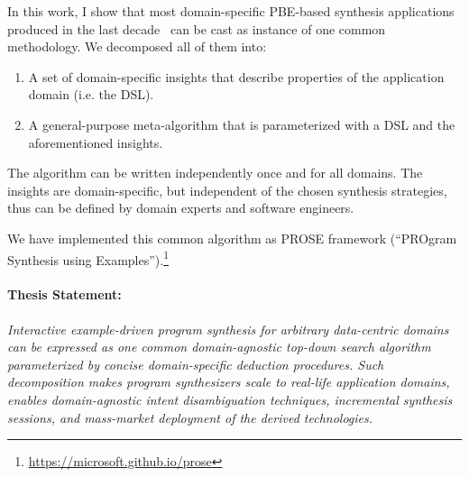 In this work, I show that most domain-specific PBE-based synthesis applications produced in the last
decade~\cite{smartedit,miller:colorful,flashfill,flashextract,flashrelate,flashnormalize,vldb12:semantic,andersen:procedural,pldi15:swarat,pldi15:osera,harris2011spreadsheet,singh2012synthesizing}
can be cast as instance of one common methodology.
We decomposed all of them into:
\begin{enumerate}[nosep]
    \item A set of domain-specific insights that describe properties of the application domain (i.e. the DSL).
    \item A general-purpose meta-algorithm that is parameterized with a DSL and the aforementioned insights.
\end{enumerate}
The algorithm can be written independently once and for all domains.
The insights are domain-specific, but independent of the chosen synthesis strategies, thus can be defined by
domain experts and software engineers.

We have implemented this common algorithm as PROSE framework (``PROgram Synthesis using
Examples'').\footnote{\url{https://microsoft.github.io/prose}}

\paragraph{Thesis Statement:}
\emph{
    Interactive example-driven program synthesis for arbitrary data-centric domains can be expressed as one common
    domain-agnostic top-down search algorithm parameterized by concise domain-specific deduction procedures.
    Such decomposition makes program synthesizers scale to real-life application domains, enables domain-agnostic
    intent disambiguation techniques, incremental synthesis sessions, and mass-market deployment of the derived
    technologies.
}

